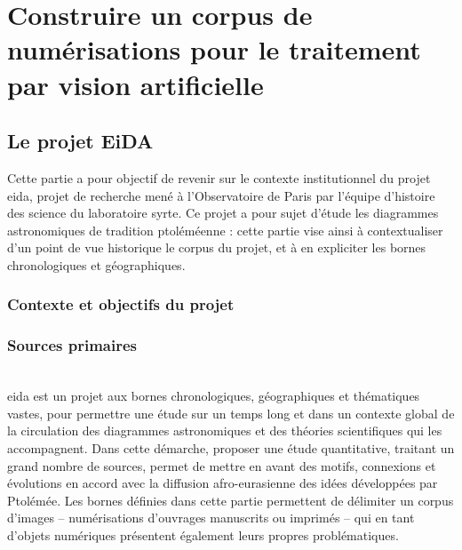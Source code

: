 \documentclass[a4paper,12pt,twoside]{book}
\newcommand{\eida}{\gls{eida}\xspace}
\newcommand{\clearemptydoublepage}{\newpage{\pagestyle{empty}\cleardoublepage}}
\begin{document}
    \clearemptydoublepage

\mainmatter

    \part{Construire un corpus de numérisations pour le traitement par vision artificielle}
        \chapter{Le projet EiDA}
        Cette partie a pour objectif de revenir sur le contexte institutionnel du projet \eida, projet de recherche mené à l'Observatoire de Paris par l'équipe d'histoire des science du laboratoire \acrshort{syrte}. Ce projet a pour sujet d'étude les diagrammes astronomiques de tradition ptoléméenne : cette partie vise ainsi à contextualiser d'un point de vue historique le corpus du projet, et à en expliciter les bornes chronologiques et géographiques.
        
	        \section{Contexte et objectifs du projet}
	            
	
	        \section{Sources primaires}
	            
			\\
		
		\eida est un projet aux bornes chronologiques, géographiques et thématiques vastes, pour permettre une étude sur un temps long et dans un contexte global de la circulation des diagrammes astronomiques et des théories scientifiques qui les accompagnent. Dans cette démarche, proposer une étude quantitative, traitant un grand nombre de sources, permet de mettre en avant des motifs, connexions et évolutions en accord avec la diffusion afro-eurasienne des idées développées par Ptolémée. Les bornes définies dans cette partie permettent de délimiter un corpus d'images -- numérisations d'ouvrages manuscrits ou imprimés -- qui en tant d'objets numériques présentent également leurs propres problématiques.
        \clearemptydoublepage
        
\end{document}

